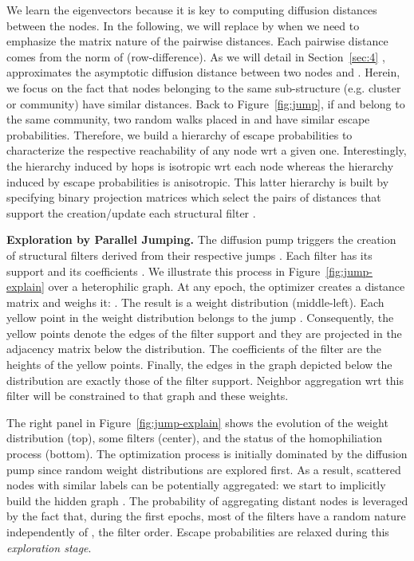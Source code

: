 \documentclass{article}
\theoremstyle{plain}
\theoremstyle{definition}
\begin{document}
We learn the eigenvectors  because it is key to computing diffusion distances between the nodes. In the following, we will replace  by  when we need to emphasize the matrix nature of the pairwise distances. Each pairwise distance  comes from the norm of  (row-difference). As we will detail in Section~\ref{sec:4} ,  approximates  the asymptotic diffusion distance between two nodes  and . Herein, we focus on the fact that nodes belonging to the same sub-structure (e.g. cluster or community) have similar distances. Back to Figure~\ref{fig:jump}, if  and  belong to the same community, two random walks placed in  and  have similar escape probabilities. Therefore, we build a hierarchy of escape probabilities to characterize the respective reachability of any node wrt a given one. Interestingly, the hierarchy induced by hops is isotropic wrt each node whereas the hierarchy induced by escape probabilities is anisotropic. This latter hierarchy is built by specifying binary projection matrices  which select the pairs of distances that support the creation/update each structural filter . 

\textbf{Exploration by Parallel Jumping.} The diffusion pump triggers the creation of  structural filters  derived from their respective jumps . Each filter  has its support  and its coefficients . We illustrate this process in Figure~\ref{fig:jump-explain} over a heterophilic graph. At any epoch, the optimizer creates a distance matrix  and weighs it: . The result is a weight distribution (middle-left). Each yellow point in the weight distribution belongs to the jump . Consequently, the yellow points denote the edges of the filter support  and they are projected in the adjacency matrix below the distribution. The coefficients  of the filter are the heights of the yellow points. Finally, the edges in the graph depicted below the distribution are exactly those of the filter support. Neighbor aggregation wrt this filter  will be constrained to that graph and these weights. 

The right panel in Figure~\ref{fig:jump-explain} shows the evolution of the weight distribution (top), some filters (center), and the status of the homophiliation process (bottom). The optimization process is initially dominated by the diffusion pump since random weight distributions are explored first. As a result, scattered nodes with similar labels can be potentially aggregated: we start to implicitly build the hidden graph . The probability of aggregating distant nodes is leveraged by the fact that, during the first epochs, most of the  filters  have a random nature independently of  , the filter order. Escape probabilities are relaxed during this \emph{exploration stage}.  
\end{document}

